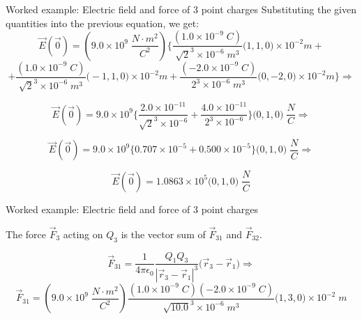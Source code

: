{\begin{frame}{Worked example: Electric field and force of 3 point charges}
Substituting the given quantities into the previous equation, we get:
\begin{equation*}
  \vec{E}(\vec{0}) =
      (9.0 \times 10^9 \; \frac{N \cdot m^2}{C^2}) \Big\{
          \frac{ (1.0 \times 10^{-9} \; C)}{\sqrt{2}^3 \times 10^{-6} \; m^3} \Big( 1, 1, 0 \Big) \times 10^{-2} m +
\end{equation*}
\begin{equation*}
        + \frac{ (1.0 \times 10^{-9} \; C)}{\sqrt{2}^3 \times 10^{-6} \; m^3} \Big(-1, 1, 0 \Big) \times 10^{-2} m +
          \frac{(-2.0 \times 10^{-9} \; C)}{2^3 \times 10^{-6} \; m^3}        \Big( 0,-2, 0 \Big) \times 10^{-2} m
      \Big\} \Rightarrow
\end{equation*}

\begin{equation*}
  \vec{E}(\vec{0}) =
      9.0 \times 10^9 \Big\{
          \frac{2.0 \times 10^{-11}}{\sqrt{2}^3 \times 10^{-6}} + \frac{4.0 \times 10^{-11}}{2^3 \times 10^{-6}} \Big\} \Big(0, 1, 0 \Big) \; \frac{N}{C}
  \Rightarrow
\end{equation*}

\begin{equation*}
  \vec{E}(\vec{0}) =
      9.0 \times 10^9 \Big\{
               0.707 \times 10^{-5} + 0.500 \times 10^{-5} \Big\} \Big(0, 1, 0 \Big) \; \frac{N}{C}
  \Rightarrow
\end{equation*}

\begin{equation*}
  \vec{E}(\vec{0}) =
      1.0863 \times 10^5 \Big(0, 1, 0 \Big) \; \frac{N}{C}
\end{equation*}

\end{frame}

%
%
%

\begin{frame}{Worked example: Electric field and force of 3 point charges}


The force $\vec{F}_{3}$ acting on $Q_3$ is the vector sum of $\vec{F}_{31}$ and $\vec{F}_{32}$.

\begin{equation*}
  \vec{F}_{31} = \frac{1}{4\pi \epsilon_0} \frac{Q_1 Q_3}{|\vec{r}_3-\vec{r}_1|^3} \Big( \vec{r}_3-\vec{r}_1 \Big) \Rightarrow
\end{equation*}
\begin{equation*}
  \vec{F}_{31} = (9.0 \times 10^9 \; \frac{N \cdot m^2}{C^2})
     \frac{(1.0 \times 10^{-9} \; C)(-2.0 \times 10^{-9} \; C)}{\sqrt{10.0}^3 \times 10^{-6} \; m^3} \Big(1,3,0\Big) \times 10^{-2} \; m
\end{equation*}


\end{frame}}
